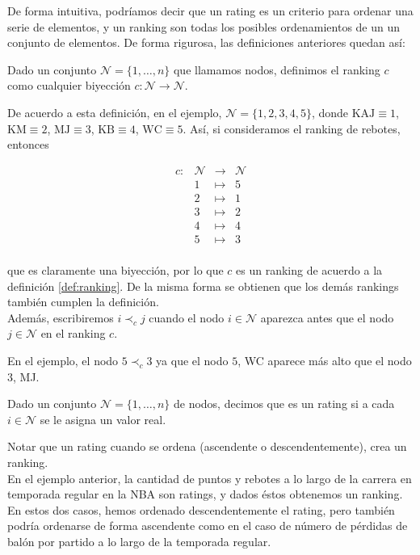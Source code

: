 De forma intuitiva, podríamos decir que un rating es un criterio para ordenar una serie de elementos, y un ranking son todas los posibles ordenamientos de un un conjunto de elementos. De forma rigurosa, las definiciones anteriores quedan así:

\begin{defi} \label{def:ranking}
Dado un conjunto $\mathcal{N} = \{1,\dots,n\}$ que llamamos nodos, definimos el ranking $c$ como cualquier biyección $c : \mathcal{N} \to \mathcal{N}$.
\end{defi}

De acuerdo a esta definición, en el ejemplo, $\mathcal{N} = \{1,2,3,4,5\}$, donde $\text{KAJ}\equiv 1$, $\text{KM}\equiv 2$, $\text{MJ}\equiv 3$, $\text{KB}\equiv 4$, $\text{WC}\equiv 5$. Así, si consideramos el ranking de rebotes, entonces

\[ \begin{array}{rlll}
c: & \mathcal{N} & \to & \mathcal{N}\\
& 1 & \mapsto & 5\\
& 2 & \mapsto & 1\\
& 3 & \mapsto & 2\\
& 4 & \mapsto & 4\\
& 5 & \mapsto & 3\\
\end{array} \] 

que es claramente una biyección, por lo que $c$ es un ranking de acuerdo a la definición \ref{def:ranking}. De la misma forma se obtienen que los demás rankings también cumplen la definición.\\

Además, escribiremos $i \prec_c j$ cuando el nodo $i \in \mathcal{N}$ aparezca antes que el nodo $j \in \mathcal{N}$ en el ranking $c$.

En el ejemplo, el nodo $5 \prec_c 3$ ya que el nodo $5$, WC aparece más alto que el nodo $3$, MJ.

\begin{defi}
Dado un conjunto $\mathcal{N} = \{1,\dots, n\}$ de nodos, decimos que es un rating si a cada $i \in \mathcal{N}$ se le asigna un valor real. 
\end{defi}

Notar que un rating cuando se ordena (ascendente o descendentemente), crea un ranking.\\

En el ejemplo anterior, la cantidad de puntos y rebotes a lo largo de la carrera en temporada regular en la NBA son ratings, y dados éstos obtenemos un ranking. En estos dos casos, hemos ordenado descendentemente el rating, pero también podría ordenarse de forma ascendente como en el caso de número de pérdidas de balón por partido a lo largo de la temporada regular. 

